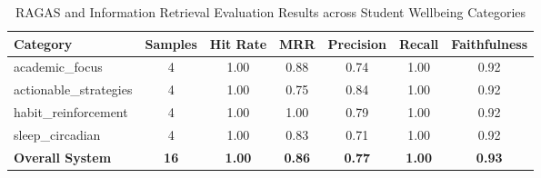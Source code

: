 \begin{table}[htbp]
  \centering
  \caption{RAGAS and Information Retrieval Evaluation Results across Student Wellbeing Categories}
  \label{tab:ragas_evaluation}
  \begin{tabular}{lcccccc}
    \hline
    \textbf{Category} & \textbf{Samples} & \textbf{Hit Rate} & \textbf{MRR} & \textbf{Precision} & \textbf{Recall} & \textbf{Faithfulness} \\
    \hline
    academic_focus & 4 & 1.00 & 0.88 & 0.74 & 1.00 & 0.92 \\
    actionable_strategies & 4 & 1.00 & 0.75 & 0.84 & 1.00 & 0.92 \\
    habit_reinforcement & 4 & 1.00 & 1.00 & 0.79 & 1.00 & 0.92 \\
    sleep_circadian & 4 & 1.00 & 0.83 & 0.71 & 1.00 & 0.92 \\
    \hline
    \textbf{Overall System} & \textbf{16} & \textbf{1.00} & \textbf{0.86} & \textbf{0.77} & \textbf{1.00} & \textbf{0.93} \\
    \hline
  \end{tabular}
\end{table}